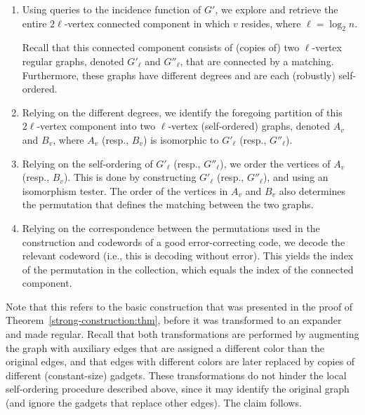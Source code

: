 \documentclass[10pt,a4paper]{article}
\theoremstyle{definition}
\newcommand{\BE}{\begin{enumerate}}
\newcommand{\EE}{\end{enumerate}}
\begin{document}
\BE
\item
Using queries to the incidence function of $G'$,
we explore and retrieve the entire $2\ell$-vertex
connected component in which $v$ resides, where $\ell=\log_2n$.

Recall that this connected component consists of (copies of)
two $\ell$-vertex regular graphs, denoted $G'_\ell$ and $G''_\ell$,
that are connected by a matching.
Furthermore, these graphs have different degrees
and are each (robustly) self-ordered.
\item
Relying on the different degrees,
we identify the foregoing partition of this $2\ell$-vertex component
into two $\ell$-vertex (self-ordered) graphs,
denoted $A_v$ and $B_v$, where $A_v$ (resp., $B_v$)
is isomorphic to $G'_\ell$ (resp., $G''_\ell$).
\item
Relying on the self-ordering of $G'_\ell$ (resp., $G''_\ell$),
we order the vertices of $A_v$ (resp., $B_v$).
This is done by constructing $G'_\ell$ (resp., $G''_\ell$),
and using an isomorphism tester.
The order of the vertices in $A_v$ and $B_v$ also determines
the permutation that defines the matching between the two graphs.
\item
Relying on the correspondence between the permutations used
in the construction and codewords of a good error-correcting code,
we decode the relevant codeword (i.e., this is decoding without error).
This yields the index of the permutation in the collection,
which equals the index of the connected component.
\EE
Note that this refers to the basic construction that was presented
in the proof of Theorem~\ref{strong-construction:thm},
before it was transformed to an expander and made regular.
Recall that both transformations are performed by augmenting
the graph with auxiliary edges that are assigned a different color
than the original edges, and that edges with different colors
are later replaced by copies of different (constant-size) gadgets.
These transformations do not hinder the local self-ordering procedure
described above, since it may identify the original graph
(and ignore the gadgets that replace other edges).
The claim follows.
\EPF
%
\end{document}
